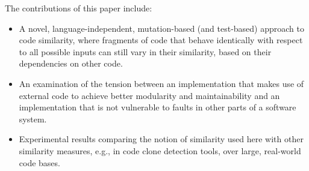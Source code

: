 The contributions of this paper include:

\begin{itemize}
\item A novel, language-independent, mutation-based (and test-based) approach to code similarity, where fragments of code that behave identically with respect to all possible inputs can still vary in their similarity, based on their dependencies on other code.
\item An examination of the tension between an implementation that makes use of external code to achieve better modularity and maintainability and an implementation that is not vulnerable to faults in other parts of a software system.
\item Experimental results comparing the notion of similarity used here with other similarity measures, e.g., in code clone detection tools, over large, real-world code bases.
\end{itemize}